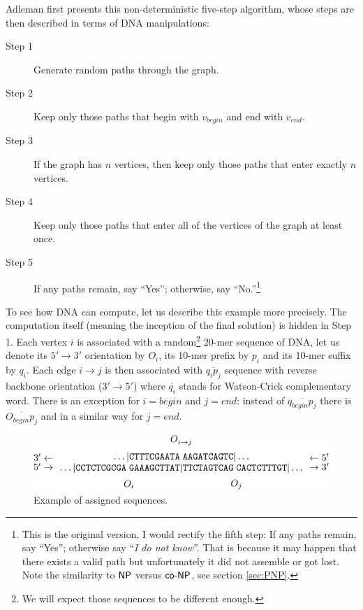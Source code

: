 		Adleman first presents this non-deterministic five-step algorithm, whose steps are then described in terms of DNA manipulations:
		\begin{description}
			\item[Step 1] Generate random paths through the graph.
			\item[Step 2] Keep only those paths that begin with $v_{begin}$ and end with $v_{end}$.
			\item[Step 3] If the graph has $n$ vertices, then keep only those paths that enter exactly $n$ vertices.
			\item[Step 4] Keep only those paths that enter all of the vertices of the graph at least once.
			\item[Step 5] If any paths remain, say ``Yes''; otherwise, say ``No.''\footnote{This is the original version, I would rectify the fifth step: If any paths remain, say ``Yes''; otherwise say ``{\em I do not know}''. That is because it may happen that there exists a valid path but unfortunately it did not assemble or got lost. Note the similarity to $\mathsf{NP}$ versus $\mathsf{co}\textnormal{-}\mathsf{NP}$, see section \ref{sec:PNP}.} %
		\end{description}
		To see %
		how DNA can compute, let us describe this example more precisely. The computation itself (meaning the inception of the final solution) is hidden in Step 1. Each vertex $i$ is associated with a random\footnote{We will expect those sequences to be different enough.} $20$-mer sequence of DNA, let us denote its $5'\rightarrow 3'$ orientation by $O_i$, its 10-mer prefix by $p_i$ and its 10-mer suffix by $q_i$. Each edge $i\rightarrow j$ is then associated with $\overline{q_i p_j}$ sequence with reverse backbone orientation ($3'\rightarrow 5'$) where $\overline{q_i}$ stands for Watson-Crick complementary word. There is an exception for $i=begin$ and $j=end$: instead of $\overline{q_{begin} p_j}$ there is $\overline{O_{begin} p_j}$ and in a similar way for $j=end$.
		
		\begin{figure}[H]
		\begin{center}
			\includegraphics{./figures/adleman_strands.pdf}
			\caption{Example of assigned sequences.}
			\label{fig:adleman_strands}
		\end{center}
		\end{figure}
		

